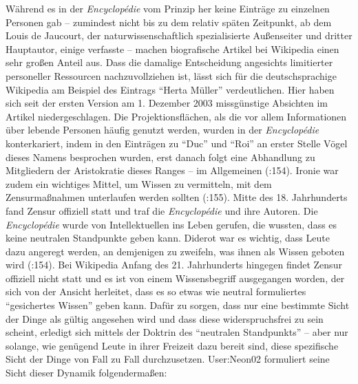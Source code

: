 \documentclass[fontsize=12pt]{scrartcl}
\begin{document}
W\"ahrend es in der \textit{Encyclop\'{e}die} vom Prinzip her keine Eintr\"age zu einzelnen Per\-so\-nen gab -- zumindest nicht bis zu dem relativ sp\"aten Zeitpunkt, ab dem Louis de Jaucourt, der naturwissenschaftlich spezialisierte Au{\ss}enseiter und dritter Hauptautor, einige verfasste -- machen biografische Artikel bei Wi\-ki\-pe\-dia einen sehr gro{\ss}en Anteil aus.
Dass die damalige Entscheidung angesichts limitierter personeller Ressourcen nachzuvollziehen ist, l\"asst sich f\"ur die deutschspra\-chi\-ge Wi\-ki\-pe\-dia am Beispiel des Eintrags "`Herta M\"uller"' verdeutlichen. \mbox{Hier} haben sich seit der ersten Version am 1. Dezember 2003 missg\"unstige Absichten im Artikel niedergeschlagen.
Die Projektionsfl\"achen, als die vor allem Informationen \"uber lebende Per\-so\-nen h\"aufig genutzt werden, wurden in der \textit{Encyclop\'{e}die} konterkariert, indem in den Eintr\"agen zu "`Duc"' und "`Roi"' an erster Stelle V\"ogel dieses Namens besprochen wurden, erst danach folgt eine Abhandlung zu Mitgliedern der Aristokratie dieses Ranges -- im Allgemeinen (\cite{Blom2004}:154). Ironie war zudem ein wichtiges Mittel, um Wissen zu vermitteln, mit dem Zensurma{\ss}nahmen unterlaufen werden sollten (\cite{Blom2004}:155). Mitte des 18. Jahrhunderts fand Zensur offiziell statt und traf die \textit{Encyclop\'{e}die} und ihre Autor\textsuperscript{\tiny *}en. Die \textit{Encyclop\'{e}die} wurde von Intellektuellen ins Leben gerufen, die wussten, dass es keine neutralen Standpunkte geben kann. Diderot war es wichtig, dass Leute dazu angeregt werden, an demjenigen zu zweifeln, was ihnen als Wissen geboten wird (\cite{Blom2004}:154). Bei Wi\-ki\-pe\-dia Anfang des 21. Jahrhunderts hingegen findet Zensur offiziell nicht statt und es ist von einem Wissensbegriff ausgegangen worden, der sich von der Ansicht herleitet, dass es so etwas wie neutral formuliertes "`gesichertes Wissen"' geben kann. Daf\"ur zu sorgen, dass nur eine bestimmte Sicht der Dinge als g\"ultig angesehen wird und dass diese widerspruchsfrei zu sein scheint, erledigt sich mittels der Doktrin des "`neutralen Standpunkts"' -- aber nur solange, wie gen\"ugend Leute in ihrer Freizeit dazu bereit sind, diese spezifische Sicht der Dinge von Fall zu Fall durchzusetzen. \mbox{User}:Neon02 formuliert seine Sicht dieser Dynamik folgenderma{\ss}en: 
\end{document}
